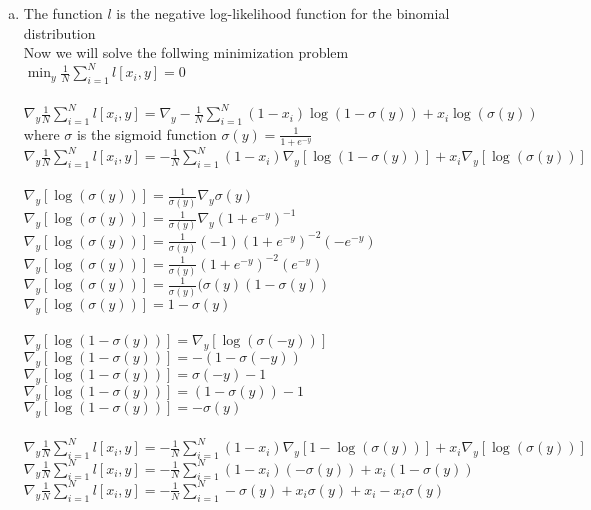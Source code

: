 \documentclass[11pt]{article}
\begin{document}
\begin{enumerate}[a)]
\item
The function $l$ is the negative log-likelihood function for the binomial distribution\\
Now we will solve the follwing minimization problem\\
$\min_{y} \frac{1}{N} \sum_{i=1}^N l[x_{i}, y] = 0$\\
\\
$\nabla_y \frac{1}{N} \sum_{i=1}^N l[x_{i}, y] = \nabla_y  -\frac{1}{N} \sum_{i=1}^N (1-x_{i}) \log(1-\sigma(y)) + x_i \log(\sigma(y))$\\
where $\sigma$ is the sigmoid function $\sigma(y) = \frac{1}{1 + e^{-y}}$\\
$\nabla_y \frac{1}{N} \sum_{i=1}^N l[x_{i}, y] = -\frac{1}{N} \sum_{i=1}^N (1-x_{i}) \nabla_y[\log(1-\sigma(y))] + x_i \nabla_y [\log(\sigma(y))]$\\
\\
$\nabla_y[\log(\sigma(y))] = \frac{1}{\sigma(y)} \nabla_y \sigma(y)$\\
$\nabla_y[\log(\sigma(y))] = \frac{1}{\sigma(y)} \nabla_y (1 + e^{-y})^{-1}$\\
$\nabla_y[\log(\sigma(y))] = \frac{1}{\sigma(y)} (-1) (1 + e^{-y})^{-2} (-e^{-y})$\\
$\nabla_y[\log(\sigma(y))] = \frac{1}{\sigma(y)} (1 + e^{-y})^{-2} (e^{-y})$\\
$\nabla_y[\log(\sigma(y))] = \frac{1}{\sigma(y)} (\sigma(y) (1-\sigma(y))$\\
$\nabla_y[\log(\sigma(y))] = 1-\sigma(y)$\\
\\
$\nabla_y[\log(1-\sigma(y))] = \nabla_y[\log(\sigma(-y))]$\\
$\nabla_y[\log(1-\sigma(y))] = -(1-\sigma(-y))$\\
$\nabla_y[\log(1-\sigma(y))] = \sigma(-y) - 1$\\
$\nabla_y[\log(1-\sigma(y))] = (1 - \sigma(y)) - 1$\\
$\nabla_y[\log(1-\sigma(y))] = - \sigma(y)$\\
\\
$\nabla_y \frac{1}{N} \sum_{i=1}^N l[x_{i}, y] = -\frac{1}{N} \sum_{i=1}^N (1-x_{i}) \nabla_y[1-\log(\sigma(y))] + x_i \nabla_y [\log(\sigma(y))]$\\
$\nabla_y \frac{1}{N} \sum_{i=1}^N l[x_{i}, y] = -\frac{1}{N} \sum_{i=1}^N (1-x_{i}) (- \sigma(y)) + x_i (1-\sigma(y))$\\
$\nabla_y \frac{1}{N} \sum_{i=1}^N l[x_{i}, y] = -\frac{1}{N} \sum_{i=1}^N -\sigma(y) + x_i \sigma(y) + x_i - x_i \sigma(y)$\\

\end{enumerate}
\end{document}
